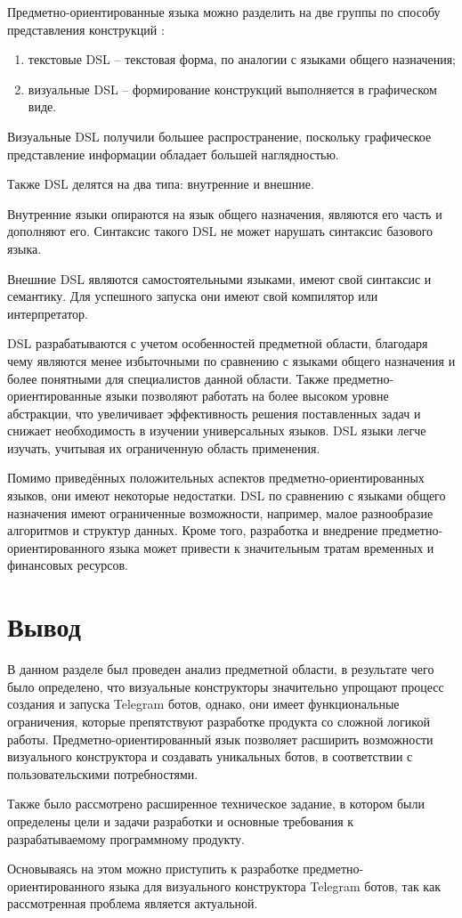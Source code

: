Предметно-ориентированные языка можно разделить на две группы по способу представления конструкций :
\begin{enumerate}
    \item текстовые DSL -- текстовая форма, по аналогии с языками общего назначения;
    \item визуальные DSL -- формирование конструкций выполняется в графическом виде.
\end{enumerate}

Визуальные DSL получили большее распространение, поскольку графическое представление информации обладает большей наглядностью.

Также DSL делятся на два типа: внутренние и внешние.

Внутренние языки опираются на язык общего назначения, являются его часть и дополняют его.
Синтаксис такого DSL не может нарушать синтаксис базового языка.

Внешние DSL являются самостоятельными языками, имеют свой синтаксис и семантику.
Для успешного запуска они имеют свой компилятор или интерпретатор.

DSL разрабатываются с учетом особенностей предметной области,
благодаря чему являются менее избыточными по сравнению с языками общего назначения и более понятными для специалистов данной области.
Также предметно-ориентированные языки позволяют работать на более высоком уровне абстракции,
что увеличивает эффективность решения поставленных задач и снижает необходимость в изучении универсальных языков.
DSL языки легче изучать, учитывая их ограниченную область применения.

Помимо приведённых положительных аспектов предметно-ориентированных языков, они имеют некоторые недостатки.
DSL по сравнению с языками общего назначения имеют ограниченные возможности, например, малое разнообразие алгоритмов и структур данных.
Кроме того, разработка и внедрение предметно-ориентированного языка может привести к значительным тратам временных и финансовых ресурсов.



\section*{Вывод}

В данном разделе был проведен анализ предметной области, в результате чего было определено,
что визуальные конструкторы значительно упрощают процесс создания и запуска Telegram ботов,
однако, они имеет функциональные ограничения, которые препятствуют разработке продукта со сложной логикой работы.
Предметно-ориентированный язык позволяет расширить возможности визуального конструктора и создавать уникальных ботов,
в соответствии с пользовательскими потребностями.

Также было рассмотрено расширенное техническое задание,
в котором были определены цели и задачи разработки и основные требования к разрабатываемому программному продукту.

Основываясь на этом можно приступить к разработке предметно-ориентированного языка для визуального конструктора Telegram ботов,
так как рассмотренная проблема является актуальной.